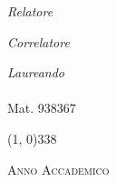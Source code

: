\begin{titlepage}
\begin{center}
\vspace{30pt} 

\begin{minipage}{\linewidth}
	\centering
	\begin{minipage}{0.45\linewidth}
		\begin{large}
		\begin{flushleft}
			\textit{Relatore}\\ 
			\vspace{5pt} 
			\profTitle\:\myProf
		\end{flushleft}
		\begin{flushleft}
			\textit{Correlatore}\\ 
			\vspace{5pt} 
			\correlatoreTitle\:\myCorrelatore
		\end{flushleft}
		\end{large}
	\end{minipage}
	\begin{minipage}{0.45\linewidth}
		\begin{large}
		\begin{flushright}
			\textit{Laureando}\\ 
			\vspace{5pt}  
			\myName\\
			Mat. 938367
			\end{flushright}
		\end{large}
	\end{minipage}
\end{minipage}

\vspace{25pt} 

\line(1, 0){338} \\
\begin{normalsize}
\textsc{Anno Accademico \myAA}
\end{normalsize}

\end{center}
\end{titlepage} 